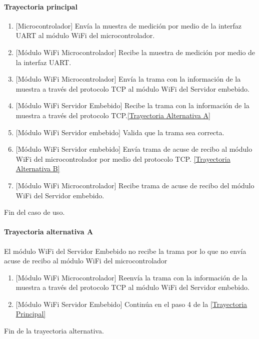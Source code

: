\paragraph{Trayectoria principal}
\label{SUB-M-CU1.4:TP}
	\begin{enumerate}
	    \item {[Microcontrolador]} Envía la muestra de medición por medio de la interfaz UART al módulo WiFi del microcontrolador.
	    \item {[Módulo WiFi Microcontrolador]} Recibe la muestra de medición por medio de la interfaz UART.
	    \item {[Módulo WiFi Microcontrolador]} Envía la trama con la información de la muestra a través del protocolo TCP al módulo WiFi del Servidor embebido.
	    \item {[Módulo WiFi Servidor Embebido]} Recibe la trama con la información de la muestra a través del protocolo TCP.\hyperref[SUB-M-CU1.4:TA]{[Trayectoria Alternativa A]}
	    \item {[Módulo WiFi Servidor embebido]} Valida que la trama sea correcta. 
	    \item {[Módulo WiFi Servidor embebido]} Envía trama de acuse de recibo al módulo WiFi del microcontrolador por medio del protocolo TCP. \hyperref[SUB-M-CU1.4:TB]{[Trayectoria Alternativa B]}
	    \item {[Módulo WiFi Microcontrolador]} Recibe trama de acuse de recibo del módulo WiFi del Servidor embebido.
	\end{enumerate}
	Fin del caso de uso.


\paragraph{Trayectoria alternativa A} \label{SUB-M-CU1.4:TA}
	El módulo WiFi del Servidor Embebido no recibe la trama por lo que no envía acuse de recibo al módulo WiFi del microcontrolador
	\begin{enumerate}[label=A\arabic*.]
		\item {[Módulo WiFi Microcontrolador]} Reenvía la trama con la información de la muestra a través del protocolo TCP al módulo WiFi del Servidor embebido.
		\item {[Módulo WiFi Servidor Embebido]} Continúa en el paso 4 de la \hyperref[SUB-M-CU1.4:TP]{[Trayectoria Principal]}
	\end{enumerate}
	Fin de la trayectoria alternativa.

